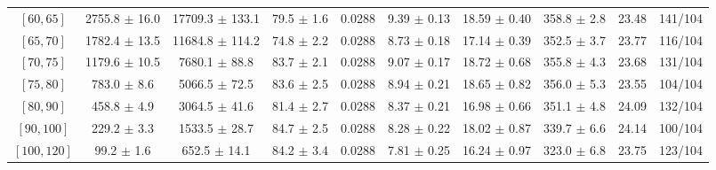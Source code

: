 \begin{tabular}{c||c|c|c|c|c|c|c||c|c}
$[60, 65]$ & 2755.8 $\pm$ 16.0 & 17709.3 $\pm$ 133.1 & 79.5 $\pm$ 1.6 & 0.0288 & 9.39 $\pm$ 0.13 & 18.59 $\pm$ 0.40 & 358.8 $\pm$ 2.8 & 23.48 & 141/104\\
$[65, 70]$ & 1782.4 $\pm$ 13.5 & 11684.8 $\pm$ 114.2 & 74.8 $\pm$ 2.2 & 0.0288 & 8.73 $\pm$ 0.18 & 17.14 $\pm$ 0.39 & 352.5 $\pm$ 3.7 & 23.77 & 116/104\\
$[70, 75]$ & 1179.6 $\pm$ 10.5 & 7680.1 $\pm$ 88.8 & 83.7 $\pm$ 2.1 & 0.0288 & 9.07 $\pm$ 0.17 & 18.72 $\pm$ 0.68 & 355.8 $\pm$ 4.3 & 23.68 & 131/104\\
$[75, 80]$ & 783.0 $\pm$ 8.6 & 5066.5 $\pm$ 72.5 & 83.6 $\pm$ 2.5 & 0.0288 & 8.94 $\pm$ 0.21 & 18.65 $\pm$ 0.82 & 356.0 $\pm$ 5.3 & 23.55 & 104/104\\
$[80, 90]$ & 458.8 $\pm$ 4.9 & 3064.5 $\pm$ 41.6 & 81.4 $\pm$ 2.7 & 0.0288 & 8.37 $\pm$ 0.21 & 16.98 $\pm$ 0.66 & 351.1 $\pm$ 4.8 & 24.09 & 132/104\\
$[90, 100]$ & 229.2 $\pm$ 3.3 & 1533.5 $\pm$ 28.7 & 84.7 $\pm$ 2.5 & 0.0288 & 8.28 $\pm$ 0.22 & 18.02 $\pm$ 0.87 & 339.7 $\pm$ 6.6 & 24.14 & 100/104\\
$[100, 120]$ & 99.2 $\pm$ 1.6 & 652.5 $\pm$ 14.1 & 84.2 $\pm$ 3.4 & 0.0288 & 7.81 $\pm$ 0.25 & 16.24 $\pm$ 0.97 & 323.0 $\pm$ 6.8 & 23.75 & 123/104\\
\end{tabular}
